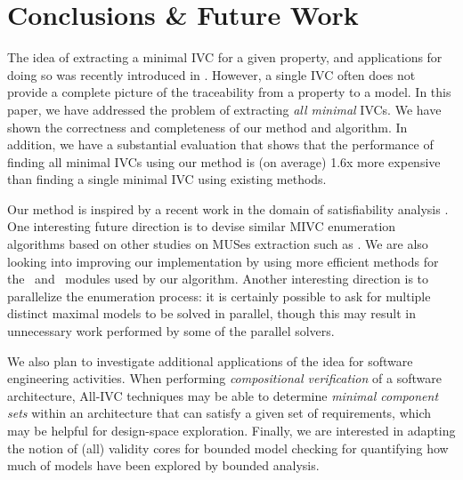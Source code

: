 \section{Conclusions \& Future Work}
\label{sec:conc}
The idea of extracting a minimal IVC for a given property, and applications for doing so was recently introduced in \cite{Ghass16}.  However, a single IVC often does not provide a complete picture of the traceability from a property to a model.  In this paper, 
we have addressed the problem of extracting {\em all minimal} IVCs. We have shown
the correctness and completeness of our method and algorithm.  In addition, we have a substantial evaluation that shows that the performance of finding all minimal IVCs using our method is (on average) 1.6x more expensive than finding a single minimal IVC using existing methods.

Our method is inspired by a recent work in the domain of satisfiability analysis \cite{marco2016fast}. One interesting future direction is to devise similar MIVC enumeration algorithms based on other studies on MUSes extraction such as \cite{nadel2014accelerated}.  We are also looking into improving our implementation by using more  efficient methods for the \isadeq ~and \getivc ~modules used by our algorithm. Another interesting direction is to parallelize the enumeration process: it is certainly possible to ask for multiple distinct maximal models to be solved in parallel, though this may result in unnecessary work performed by some of the parallel solvers.

We also plan to investigate additional applications of the idea for software engineering activities.  When performing {\em compositional verification} of a software architecture, All-IVC techniques may be able to determine {\em minimal component sets} within an architecture that can satisfy a given set of requirements, which may be helpful for design-space exploration.
%
Finally, we are interested in adapting the notion of (all) validity cores for bounded model checking for quantifying how much of models have been explored by bounded analysis. 
